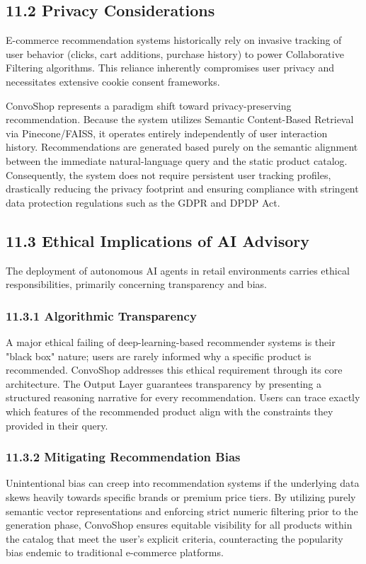 \subsection*{11.2 Privacy Considerations}
E-commerce recommendation systems historically rely on invasive tracking of user behavior (clicks, cart additions, purchase history) to power Collaborative Filtering algorithms. This reliance inherently compromises user privacy and necessitates extensive cookie consent frameworks.

ConvoShop represents a paradigm shift toward privacy-preserving recommendation. Because the system utilizes Semantic Content-Based Retrieval via Pinecone/FAISS, it operates entirely independently of user interaction history. Recommendations are generated based purely on the semantic alignment between the immediate natural-language query and the static product catalog. Consequently, the system does not require persistent user tracking profiles, drastically reducing the privacy footprint and ensuring compliance with stringent data protection regulations such as the GDPR and DPDP Act.

\subsection*{11.3 Ethical Implications of AI Advisory}
The deployment of autonomous AI agents in retail environments carries ethical responsibilities, primarily concerning transparency and bias.

\subsubsection*{11.3.1 Algorithmic Transparency}
A major ethical failing of deep-learning-based recommender systems is their "black box" nature; users are rarely informed why a specific product is recommended. ConvoShop addresses this ethical requirement through its core architecture. The Output Layer guarantees transparency by presenting a structured reasoning narrative for every recommendation. Users can trace exactly which features of the recommended product align with the constraints they provided in their query.

\subsubsection*{11.3.2 Mitigating Recommendation Bias}
Unintentional bias can creep into recommendation systems if the underlying data skews heavily towards specific brands or premium price tiers. By utilizing purely semantic vector representations and enforcing strict numeric filtering prior to the generation phase, ConvoShop ensures equitable visibility for all products within the catalog that meet the user's explicit criteria, counteracting the popularity bias endemic to traditional e-commerce platforms.

